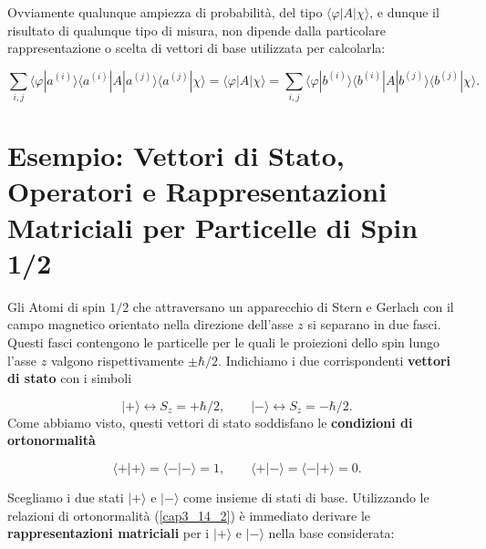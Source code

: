 Ovviamente qualunque ampiezza di probabilità, del tipo $ \langle \varphi | A | \chi \rangle $, e dunque il risultato di qualunque tipo di misura, non dipende dalla particolare rappresentazione o scelta di vettori di base utilizzata per calcolarla:

\begin{equation}
\sum \limits_{i,j} \langle \varphi | a^{(i)} \rangle \langle a^{(i)} | A | a^{(j)} \rangle \langle a^{(j)} | \chi \rangle = \langle \varphi | A | \chi \rangle = \sum \limits_{i,j} \langle \varphi | b^{(i)} \rangle \langle b^{(i)} | A | b^{(j)} \rangle \langle b^{(j)} | \chi \rangle .
\end{equation}

\section[Esempio:Particelle di Spin 1/2]{Esempio: Vettori di Stato, Operatori e Rappresentazioni Matriciali per Particelle di Spin 1/2}
Gli Atomi di spin $1/2$ che attraversano un apparecchio di Stern e Gerlach con il campo magnetico orientato nella direzione dell'asse $z$ si separano in due fasci. Questi fasci contengono le particelle per le quali le proiezioni dello spin lungo l'asse $z$ valgono rispettivamente $\pm \hbar/2$. Indichiamo i due corrispondenti \textbf{vettori di stato} con i simboli

\begin{equation}
| + \rangle \leftrightarrow S_z= +\hbar/2, \qquad | - \rangle \leftrightarrow S_z=-\hbar/2 .
\label{cap3_14}
\end{equation}
Come abbiamo visto, questi vettori di stato soddisfano le \textbf{condizioni di ortonormalità}

\begin{equation}
\langle + | + \rangle = \langle - | - \rangle =1,\qquad \langle + | - \rangle = \langle - | + \rangle =0 .
\label{cap3_14_2}
\end{equation}

Scegliamo i due stati $| + \rangle $ e $ | - \rangle$ come insieme di stati di base. Utilizzando le relazioni di ortonormalità (\ref{cap3_14_2}) è immediato derivare le \textbf{rappresentazioni matriciali} per i $| + \rangle$ e $| - \rangle$ nella base considerata:

